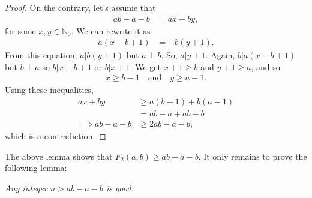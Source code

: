\documentclass{subfile}
\begin{document}
	\begin{proof}
		On the contrary, let's assume that
			\begin{align*}
				ab-a-b & = ax+by,
			\end{align*}
		for some $x,y\in\mathbb{N}_0$. We can rewrite it as
			\begin{align*}
				a(x-b+1) & = -b(y+1).
			\end{align*}
		From this equation, $a|b(y+1)$ but $a\perp b$. So, $a|y+1$. Again, $b|a(x-b+1)$ but $b\perp a$ so $b|x-b+1$ or $b|x+1$. We get $x+1\geq b$ and $y+1\geq a$, and so
			\begin{align*}
				 x\geq b-1 \quad \text{and} \quad y \geq a-1.
			\end{align*}
		Using these inequalities,
			\begin{align*}
				 ax+by & \geq a(b-1)+b(a-1) \\
				&= ab-a+ab-b\\
				\implies   ab-a-b & \geq 2ab-a-b,
			\end{align*}
		which is a contradiction.
	\end{proof}

%
%
%
The above lemma shows that $F_2(a,b) \geq ab-a-b$. It only remains to prove the following lemma:
	\begin{lemma}\slshape
		Any integer $n>ab-a-b$ is good.
	\end{lemma}
\end{document}

